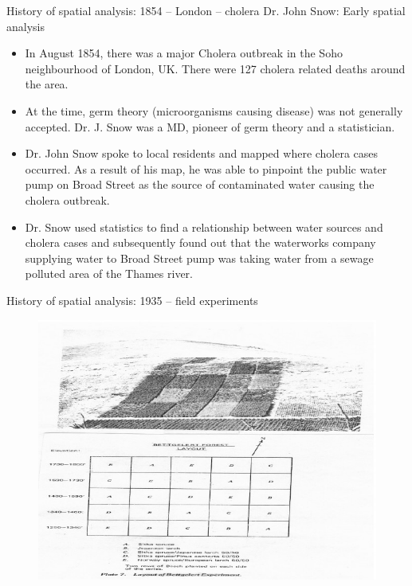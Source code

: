 \documentclass{beamer}
\begin{document}
\begin{frame}{History of spatial analysis: 1854 -- London -- cholera}
 Dr. John Snow: Early spatial analysis\\
\medskip
\begin{itemize}
    \item In August 1854, there was a major Cholera outbreak in the Soho neighbourhood of London, UK. There were 127 cholera related deaths around the area.
    \smallskip
    \item At the time, germ theory (microorganisms causing disease) was not generally accepted. Dr. J. Snow was a MD, pioneer of germ theory and a statistician.
    \smallskip
    \item Dr. John Snow spoke to local residents and mapped where cholera cases occurred. As a result of his map, he was able to pinpoint the public water pump on Broad Street as the source of contaminated water causing the cholera outbreak.
    \smallskip
    \item Dr. Snow used statistics to find a relationship between water sources and cholera cases and subsequently found out that the waterworks company supplying water to Broad Street pump was taking water from a sewage polluted area of the Thames river.
\end{itemize}
\end{frame}
\begin{frame}{History of spatial analysis: 1935 -- field experiments}
\vspace{-0.5cm}
\begin{figure}
	\includegraphics[width=.8\textwidth]{IMG/sp_Fisher.jpg}
\end{figure}
\end{frame}
\end{document}
